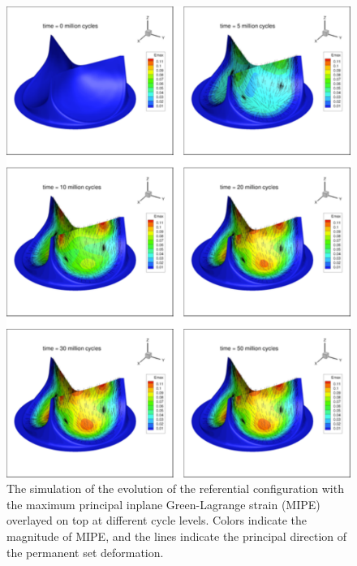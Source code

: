 \begin{figure}
\centering
\includegraphics[width=5in]{Images/chapter6/psdeformation.pdf}
\caption{The simulation of the evolution of the referential configuration with the maximum principal in\Hyphdash plane Green-Lagrange strain (MIPE) overlayed on top at different cycle levels. Colors indicate the magnitude of MIPE, and the lines indicate the principal direction of the permanent set deformation.}
\label{c6:fig:psdeformation}
\end{figure}

